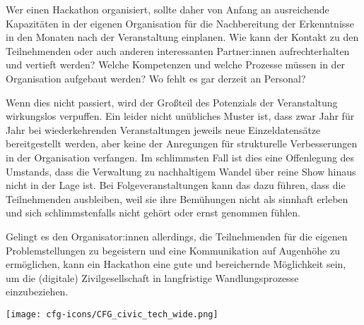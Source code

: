 Wer einen Hackathon organisiert, sollte daher von Anfang an ausreichende Kapazitäten in der eigenen Organisation für die Nachbereitung der Erkenntnisse in den Monaten nach der Veranstaltung einplanen. Wie kann der Kontakt zu den Teilnehmenden oder auch anderen interessanten Partner:innen aufrechterhalten und vertieft werden? Welche Kompetenzen und welche Prozesse müssen in der Organisation aufgebaut werden? Wo fehlt es gar derzeit an Personal?

Wenn dies nicht passiert, wird der Großteil des Potenzials der Veranstaltung wirkungslos verpuffen. Ein leider nicht unübliches Muster ist, dass zwar Jahr für Jahr bei wiederkehrenden Veranstaltungen jeweils neue Einzeldatensätze bereitgestellt werden, aber keine der Anregungen für strukturelle Verbesserungen in der Organisation verfangen. Im schlimmsten Fall ist dies eine Offenlegung des Umstands, dass die Verwaltung zu nachhaltigem Wandel über reine Show hinaus nicht in der Lage ist. Bei Folgeveranstaltungen kann das dazu führen, dass die Teilnehmenden ausbleiben, weil sie ihre Bemühungen nicht als sinnhaft erleben und sich schlimmstenfalls nicht gehört oder ernst genommen fühlen.

Gelingt es den Organisator:innen allerdings, die Teilnehmenden für die eigenen Problemstellungen zu begeistern und eine Kommunikation auf Augenhöhe zu ermöglichen, kann ein Hackathon eine gute und bereichernde Möglichkeit sein, um die (digitale) Zivilgesellschaft in langfristige Wandlungsprozesse einzubeziehen.



\vspace{6cm}
\begin{figure*}[h!]
	\texttt{[image: cfg-icons/CFG\_civic\_tech\_wide.png]}
\end{figure*}



